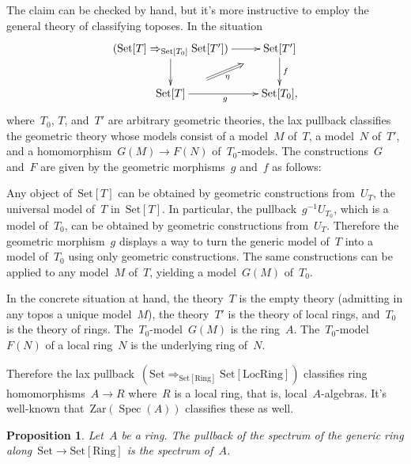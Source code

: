 \documentclass[10pt,reqno,a4paper]{amsbook}
\makeatletter
\theoremstyle{definition}
\theoremstyle{plain}
\newtheorem{prop}[defn]{Proposition}
\theoremstyle{remark}
\newcommand{\Set}{\mathrm{Set}}
\newcommand{\Zar}{\mathrm{Zar}}
\newcommand{\Ring}{\mathrm{Ring}}
\newcommand{\LocRing}{\mathrm{LocRing}}
\DeclareMathOperator{\Spec}{Spec}
\newcommand{\?}{\,{:}\,}
\renewcommand{\_}{\mathpunct{.}\,}
\renewenvironment{proof}[1][\proofname]{\par
  \pushQED{\qed}%
  \normalfont \topsep6\p@\@plus6\p@\relax
  \trivlist
  \item[\hskip\labelsep
        \itshape
    #1\@addpunct{.}]\ignorespaces
}{%
  \popQED\endtrivlist\@endpefalse
}
\makeatother
\begin{document}
\begin{proof}The claim can be checked by hand, but it's more instructive to
employ the general theory of classifying toposes. In the situation
\[ \xymatrix{
  (\Set[T] \Rightarrow_{\Set[T_0]} \Set[T']) \ar[r] \ar[d] & \Set[T'] \ar[d]^f \\
  \Set[T] \ar[r]_g \ar@{}[ur]^(.3){}="a"^(.7){}="b" \ar@{=>}_\eta "a";"b" & \Set[T_0],
} \]
where~$T_0$, $T$, and~$T'$ are arbitrary geometric theories, the lax pullback
classifies the geometric theory whose models consist of a model~$M$ of~$T$, a
model~$N$ of~$T'$, and a homomorphism~$G(M) \to F(N)$ of~$T_0$-models. The
constructions~$G$ and~$F$ are given by the geometric morphisms~$g$ and~$f$ as
follows:

Any object of~$\Set[T]$ can be obtained by geometric constructions from~$U_T$,
the universal model of~$T$ in~$\Set[T]$. In particular, the pullback~$g^{-1}
U_{T_0}$, which is a model of~$T_0$, can be obtained by geometric constructions
from~$U_T$. Therefore the geometric morphism~$g$ displays a way to turn the
generic model of~$T$ into a model of~$T_0$ using only geometric constructions.
The same constructions can be applied to any model~$M$ of~$T$, yielding a
model~$G(M)$ of~$T_0$.

In the concrete situation at hand, the theory~$T$ is the empty theory
(admitting in any topos a unique model~$M$), the theory~$T'$ is the theory of local
rings, and~$T_0$ is the theory of rings. The~$T_0$-model~$G(M)$ is the
ring~$A$. The~$T_0$-model~$F(N)$ of a local ring~$N$ is the underlying ring
of~$N$.

Therefore the lax pullback~$(\Set \Rightarrow_{\Set[\Ring]} \Set[\LocRing])$
classifies ring homomorphisms~$A \to R$ where~$R$ is a local ring, that is,
local~$A$-algebras. It's well-known that~$\Zar(\Spec(A))$ classifies these as
well.
\end{proof}

\begin{prop}\label{prop:spectrum-as-pullback}
Let~$A$ be a ring. The pullback of the spectrum of the generic ring
along~$\Set \to \Set[\Ring]$ is the spectrum of~$A$.
\end{prop}
\end{document}
